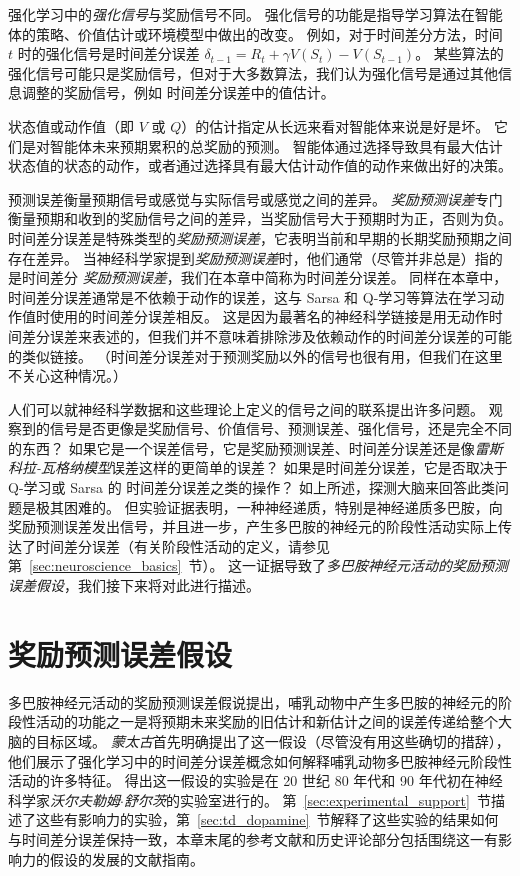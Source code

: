 强化学习中的\textit{强化信号}与奖励信号不同。
强化信号的功能是指导学习算法在智能体的策略、价值估计或环境模型中做出的改变。
例如，对于时间差分方法，时间 $ t $ 时的强化信号是时间差分误差 $ \delta_{t-1} = R_t + \gamma V(S_t) - V(S_{t-1})$。
某些算法的强化信号可能只是奖励信号，但对于大多数算法，我们认为强化信号是通过其他信息调整的奖励信号，例如 时间差分误差中的值估计。


状态值或动作值（即 $ V $ 或 $ Q $）的估计指定从长远来看对智能体来说是好是坏。
它们是对智能体未来预期累积的总奖励的预测。
智能体通过选择导致具有最大估计状态值的状态的动作，或者通过选择具有最大估计动作值的动作来做出好的决策。


预测误差衡量预期信号或感觉与实际信号或感觉之间的差异。
\textit{奖励预测误差}专门衡量预期和收到的奖励信号之间的差异，当奖励信号大于预期时为正，否则为负。 
时间差分误差是特殊类型的\textit{奖励预测误差}，它表明当前和早期的长期奖励预期之间存在差异。
当神经科学家提到\textit{奖励预测误差}时，他们通常（尽管并非总是）指的是时间差分 \textit{奖励预测误差}，我们在本章中简称为时间差分误差。
同样在本章中，时间差分误差通常是不依赖于动作的误差，这与 Sarsa 和 Q-学习等算法在学习动作值时使用的时间差分误差相反。
这是因为最著名的神经科学链接是用无动作时间差分误差来表述的，但我们并不意味着排除涉及依赖动作的时间差分误差的可能的类似链接。
（时间差分误差对于预测奖励以外的信号也很有用，但我们在这里不关心这种情况\cite{modayil2014prediction}。）


人们可以就神经科学数据和这些理论上定义的信号之间的联系提出许多问题。
观察到的信号是否更像是奖励信号、价值信号、预测误差、强化信号，还是完全不同的东西？
如果它是一个误差信号，它是奖励预测误差、时间差分误差还是像\textit{雷斯科拉-瓦格纳模型}误差这样的更简单的误差？
如果是时间差分误差，它是否取决于 Q-学习或 Sarsa 的 时间差分误差之类的操作？
如上所述，探测大脑来回答此类问题是极其困难的。
但实验证据表明，一种神经递质，特别是神经递质多巴胺，向奖励预测误差发出信号，并且进一步，产生多巴胺的神经元的阶段性活动实际上传达了时间差分误差（有关阶段性活动的定义，请参见第~\ref{sec:neuroscience_basics}~节）。
这一证据导致了\textit{多巴胺神经元活动的奖励预测误差假设}，我们接下来将对此进行描述。


\section{奖励预测误差假设}

多巴胺神经元活动的奖励预测误差假说提出，哺乳动物中产生多巴胺的神经元的阶段性活动的功能之一是将预期未来奖励的旧估计和新估计之间的误差传递给整个大脑的目标区域。
\textit{蒙太古}\cite{montague1996framework}首先明确提出了这一假设（尽管没有用这些确切的措辞），他们展示了强化学习中的时间差分误差概念如何解释哺乳动物多巴胺神经元阶段性活动的许多特征。
得出这一假设的实验是在 20 世纪 80 年代和 90 年代初在神经科学家\textit{沃尔夫勒姆$\cdot$舒尔茨}的实验室进行的。
第~\ref{sec:experimental_support}~节描述了这些有影响力的实验，第~\ref{sec:td_dopamine}~节解释了这些实验的结果如何与时间差分误差保持一致，本章末尾的参考文献和历史评论部分包括围绕这一有影响力的假设的发展的文献指南。


